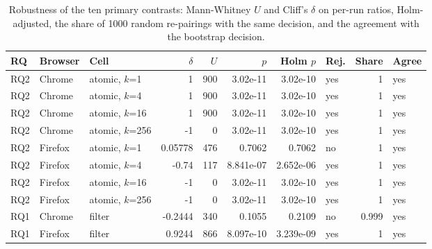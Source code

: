 \begin{table}[htbp]
\caption{Robustness of the ten primary contrasts: Mann-Whitney $U$ and Cliff's $\delta$ on per-run ratios, Holm-adjusted, the share of 1000 random re-pairings with the same decision, and the agreement with the bootstrap decision.}\label{tab:robustness}
\centering\footnotesize
\begin{tabular}{lllrrrrlrl}
\toprule
RQ & Browser & Cell & $\delta$ & $U$ & $p$ & Holm $p$ & Rej. & Share & Agree \\
\midrule
RQ2 & Chrome & atomic, $k$=1 & 1 & 900 & 3.02e-11 & 3.02e-10 & yes & 1 & yes \\
RQ2 & Chrome & atomic, $k$=4 & 1 & 900 & 3.02e-11 & 3.02e-10 & yes & 1 & yes \\
RQ2 & Chrome & atomic, $k$=16 & 1 & 900 & 3.02e-11 & 3.02e-10 & yes & 1 & yes \\
RQ2 & Chrome & atomic, $k$=256 & -1 & 0 & 3.02e-11 & 3.02e-10 & yes & 1 & yes \\
RQ2 & Firefox & atomic, $k$=1 & 0.05778 & 476 & 0.7062 & 0.7062 & no & 1 & yes \\
RQ2 & Firefox & atomic, $k$=4 & -0.74 & 117 & 8.841e-07 & 2.652e-06 & yes & 1 & yes \\
RQ2 & Firefox & atomic, $k$=16 & -1 & 0 & 3.02e-11 & 3.02e-10 & yes & 1 & yes \\
RQ2 & Firefox & atomic, $k$=256 & -1 & 0 & 3.02e-11 & 3.02e-10 & yes & 1 & yes \\
RQ1 & Chrome & filter & -0.2444 & 340 & 0.1055 & 0.2109 & no & 0.999 & yes \\
RQ1 & Firefox & filter & 0.9244 & 866 & 8.097e-10 & 3.239e-09 & yes & 1 & yes \\
\bottomrule
\end{tabular}
\end{table}
